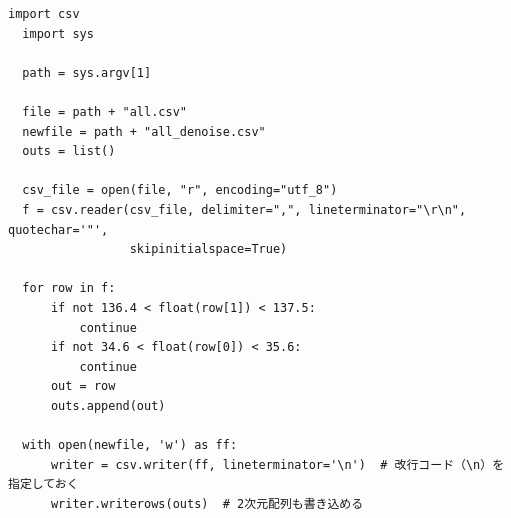 \documentclass[twocolumn, a4paper, 9pt]{jarticle}
\begin{document}
\begin{lstlisting}[caption=denoise.py, label=denoise]
  import csv
  import sys
  
  path = sys.argv[1]
  
  file = path + "all.csv"
  newfile = path + "all_denoise.csv"
  outs = list()
  
  csv_file = open(file, "r", encoding="utf_8")
  f = csv.reader(csv_file, delimiter=",", lineterminator="\r\n", quotechar='"',
                 skipinitialspace=True)
  
  for row in f:
      if not 136.4 < float(row[1]) < 137.5:
          continue
      if not 34.6 < float(row[0]) < 35.6:
          continue
      out = row
      outs.append(out)
  
  with open(newfile, 'w') as ff:
      writer = csv.writer(ff, lineterminator='\n')  # 改行コード（\n）を指定しておく
      writer.writerows(outs)  # 2次元配列も書き込める
\end{lstlisting}
\end{document}
